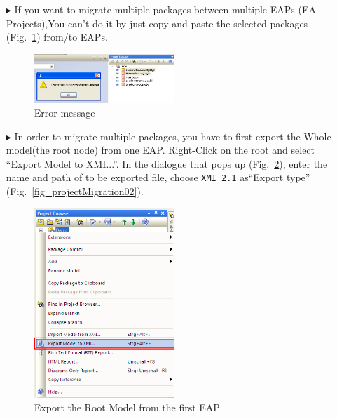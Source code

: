 \begin{enumerate}
\item[$\blacktriangleright$]If you want to migrate multiple packages between
multiple EAPs (EA Projects),You can't do it by just copy and
paste the selected packages (Fig.~\ref{fig_projectMigration00}) from/to EAPs.


\begin{figure}[htbp]
\begin{center}
  \includegraphics[width=0.5\textwidth]{pics/tricks/projectMigration/projectMigration0}
  \caption{Error message}  
  \label{fig_projectMigration00}
\end{center}
\end{figure}

\item[$\blacktriangleright$]In order to migrate multiple packages, you have to
first export the Whole model(the root node) from one EAP. Right-Click on the root
and select ``Export Model to XMI...''. In the dialogue that
pops up (Fig.~\ref{fig_projectMigration01}), enter the name and path of to be
exported file, choose \texttt{XMI 2.1} as``Export
type'' (Fig.~\ref{fig_projectMigration02}).


\begin{figure}[htbp]
\begin{center}
  \includegraphics[width=0.5\textwidth]{pics/tricks/projectMigration/projectMigration1}
  \caption{Export the Root Model from the first EAP}  
  \label{fig_projectMigration01}
\end{center}
\end{figure}



\end{enumerate}

